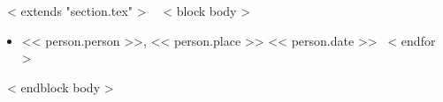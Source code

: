 \vspace{3mm}
~< extends "section.tex" >~
~< block body >~
\begin{itemize}
    ~< for person in items >~
    \item << person.person >>, << person.place >> \hfill << person.date >>
    ~< endfor >~
\end{itemize}
~< endblock body >~
